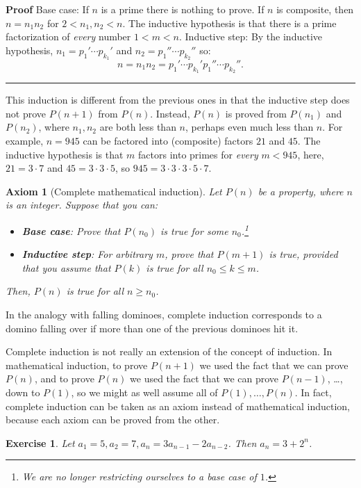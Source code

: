 \documentclass[11pt,a4paper]{report}
\newcommand*{\qed}{\hfill\rule{1ex}{1.5ex}}
\newcommand*{\qedd}[1]{\vspace*{-#1ex}\qed}
\newtheorem{axiom}{Axiom}
\newtheorem{exercise}{Exercise}
\begin{document}
\textbf{Proof} Base case: If $n$ is a prime there is nothing to prove. If $n$ is composite, then $n=n_1 n_2$ for $2 < n_1, n_2 < n$. The inductive hypothesis is that there is a prime factorization of \emph{every} number $1<m<n$. Inductive step: By the inductive hypothesis, $n_1=p_1' \cdots p_{k_1}'$ and $n_2=p_1'' \cdots p_{k_2}''$ so:
\[
n = n_1 n_2 = p_1' \cdots p_{k_1}' p_1'' \cdots p_{k_2}''.
\]

\qedd{3}

This induction is different from the previous ones in that the inductive step does not prove $P(n+1)$ from $P(n)$. Instead, $P(n)$ is proved from $P(n_1)$ and $P(n_2)$, where $n_1,n_2$ are both less than $n$, perhaps even much less than $n$. For example, $n=945$ can be factored into (composite) factors $21$ and $45$. The inductive hypothesis is that $m$ factors into primes for \emph{every} $m<945$, here, $21=3\cdot 7$ and $45=3\cdot 3\cdot 5$, so $945=3\cdot 3\cdot 3\cdot 5\cdot 7$.

\begin{axiom}[Complete mathematical induction] Let $P(n)$ be a property, where $n$ is an integer. Suppose that you can:
\begin{itemize}
\item \textbf{Base case}: Prove that $P(n_0)$ is true for some $n_0$.\footnote{We are no longer restricting ourselves to a base case of $1$.} 
\item \textbf{Inductive step}: For arbitrary $m$, prove that $P(m+1)$ is true, provided that you \emph{assume} that $P(k)$ is true for all $n_0\leq k\leq m$.
\end{itemize}
Then, $P(n)$ is true for \emph{all} $n\geq n_0$.
\end{axiom}

In the analogy with falling dominoes, complete induction corresponds to a domino falling over if more than one of the previous dominoes hit it.

Complete induction is not really an extension of the concept of induction. In mathematical induction, to prove $P(n+1)$ we used the fact that we can prove $P(n)$, and to prove $P(n)$ we used the fact that we can prove $P(n-1)$, \ldots, down to $P(1)$, so we might as well assume all of $P(1),\ldots,P(n)$. In fact, complete induction can be taken as an axiom instead of mathematical induction, because each axiom can be proved from the other.

\begin{exercise}
Let $a_1=5, a_2=7, a_n=3a_{n-1} - 2a_{n-2}$. Then $a_n=3+2^n$.
\end{exercise}
\end{document}
